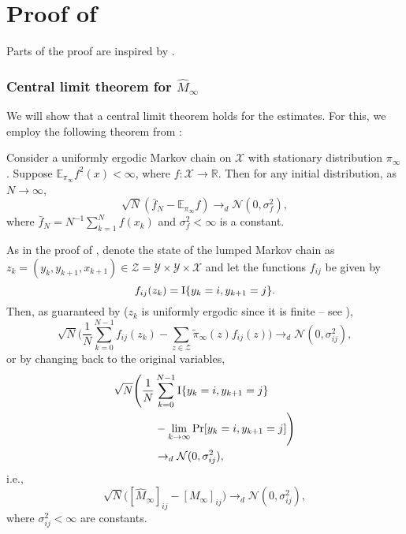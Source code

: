 \documentclass[journal]{IEEEtran}
\newcommand{\hMii}{\hat M_\infty}
\begin{document}
\section{Proof of }

Parts of the proof are inspired by \cite{kontorovich_learning_2013}.

\subsubsection{Central limit theorem for $\hMii$}

We will show that a central limit theorem holds for the estimates. For this, we
employ the following theorem from \cite{jones_markov_2004}:
\begin{theorem}
    Consider a uniformly ergodic Markov chain on $\mathcal{X}$ with stationary
    distribution $\pi_\infty$. Suppose $\mathbb{E}_{\pi_\infty} f^2(x)
    < \infty$, where $f:\mathcal{X}\to\mathbb{R}$. Then for any initial distribution, as $N \to \infty$,
    \begin{equation}
        \sqrt{N}(\bar f_N - \mathbb{E}_{\pi_\infty} f) \to_d \mathcal{N}(0,
        \sigma^2_f),
    \end{equation}
    where $\bar f_N = N^{-1} \sum_{k=1}^N f(x_k)$ and $\sigma_f^2 < \infty$ is
    a constant.
    \label{thrm:general_clt}
\end{theorem}

As in the proof of , denote the state of the lumped
Markov chain as $z_k = (y_k, y_{k+1}, x_{k+1}) \in \mathcal{Z}
= \mathcal{Y}\times\mathcal{Y}\times\mathcal{X}$ and let the functions $f_{ij}$
be given by
\begin{equation}
    f_{ij}(z_k) = \text{I}\{y_k = i, y_{k+1} = j\}.
\end{equation}
Then, as guaranteed by  ($z_k$ is uniformly ergodic
since it is finite -- see \cite[Example 1]{jones_markov_2004}),
\begin{equation}
    \sqrt{N} \Bigg( \frac{1}{N} \sum_{k=0}^{N-1} f_{ij}(z_k)
    - \sum_{z\in\mathcal{Z}} \tilde \pi_\infty(z) f_{ij}(z) \Bigg) \to_d
    \mathcal{N}(0, \sigma_{ij}^2),
\end{equation}
or by changing back to the original variables,
\begin{align}
    \sqrt{N} \Bigg( \frac{1}{N} &\sum_{k=0}^{N-1} \text{I}\{y_k = i, y_{k+1} = j\}
    \notag \\
    &- \lim_{k\to\infty} \operatorname{Pr}[y_k = i, y_{k+1} = j] \Bigg) \notag \\
    &\to_d \mathcal{N}(0, \sigma_{ij}^2),
\end{align}
i.e.,
\begin{equation}
    \sqrt{N} \Big( [\hMii]_{ij} - [M_\infty]_{ij} \Big) \to_d \mathcal{N}(0, \sigma_{ij}^2),
    \label{eq:hMii_convergence_in_p}
\end{equation}
where $\sigma_{ij}^2 < \infty$ are constants.
\end{document}
